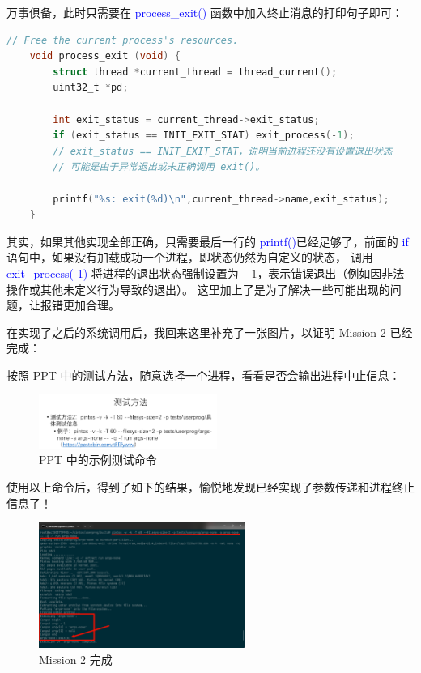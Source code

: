 \documentclass[14pt,a4paper,UTF8,twoside]{article}
\renewcommand{\texttt}[1]{\textcolor{blue}{\ttfamily #1}}
\begin{document}
万事俱备，此时只需要在 \texttt{process\_exit()} 函数中加入终止消息的打印句子即可：

\begin{lstlisting}[language=C,title= process\_exit()]
    // Free the current process's resources.
    void process_exit (void) {
        struct thread *current_thread = thread_current();
        uint32_t *pd;

        int exit_status = current_thread->exit_status;
        if (exit_status == INIT_EXIT_STAT) exit_process(-1);
        // exit_status == INIT_EXIT_STAT，说明当前进程还没有设置退出状态
        // 可能是由于异常退出或未正确调用 exit()。

        printf("%s: exit(%d)\n",current_thread->name,exit_status);
    }
\end{lstlisting}

\begin{cth}
    其实，如果其他实现全部正确，只需要最后一行的 \texttt{printf()}已经足够了，前面的 \texttt{if} 语句中，如果没有加载成功一个进程，即状态仍然为自定义的状态，
    调用 \texttt{exit\_process(-1)} 将进程的退出状态强制设置为 $-1$，表示错误退出（例如因非法操作或其他未定义行为导致的退出）。
    这里加上了是为了解决一些可能出现的问题，让报错更加合理。
\end{cth}

在实现了之后的系统调用后，我回来这里补充了一张图片，以证明 Mission 2 已经完成：

按照 PPT 中的测试方法，随意选择一个进程，看看是否会输出进程中止信息：

\begin{figure}[H]
    \centering
    \includegraphics[width=0.52\textwidth]{img6/tip1.png}
    \caption{PPT 中的示例测试命令}
    \label{fig:lab6-5}
\end{figure}

使用以上命令后，得到了如下的结果，愉悦地发现已经实现了参数传递和进程终止信息了！

\begin{figure}[H]
    \centering
    \includegraphics[width=0.6\textwidth]{img6/done.png}
    \caption{Mission 2 完成}
    \label{fig:lab6-4}
\end{figure}
\end{document}
